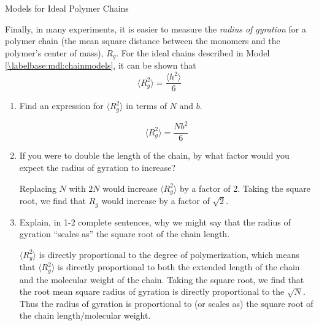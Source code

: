 \begin{activity}{Models for Ideal Polymer Chains}
\begin{ctqs}
		\begin{solution}[1.25in]\studentdisplay{}
		\end{solution}
	
	\question Finally, in many experiments, it is easier to measure the \emph{radius of gyration} for a polymer chain (the mean square distance between the monomers and the polymer's center of mass), $R_g$.  For the ideal chains described in Model \ref{\labelbase:mdl:chainmodels}, it can be shown that
		\begin{equation*}
			\langle R_g^2\rangle = \frac{\langle h^2\rangle}{6}
		\end{equation*}
		
		\begin{enumerate}
			\item Find an expression for $\langle R_g^2 \rangle$ in terms of $N$ and $b$.
	
		\begin{solution}[0.75in]
			\begin{equation*}
				\langle R_g^2 \rangle = \frac{Nb^2}{6}
			\end{equation*}
		\end{solution}
			
			\item If you were to double the length of the chain, by what factor would you expect the radius of gyration to increase?
	
		\begin{solution}[0.75in]
			Replacing $N$ with $2N$ would increase $\langle R_g^2 \rangle$ by a factor of 2. Taking the square root, we find that $R_g$ would increase by a factor of $\sqrt{2}$.
		\end{solution}
			
			\item Explain, in 1-2 complete sentences, why we might say that the radius of gyration ``scales as'' the square root of the chain length.
	
		\begin{solution}[1.5in]
			$\langle R_g^2 \rangle$ is directly proportional to the degree of polymerization, which means that $\langle R_g^2 \rangle$ is directly proportional to both the extended length of the chain and the molecular weight of the chain.  Taking the square root, we find that the root mean square radius of gyration is directly proportional to the $\sqrt{N}$.  Thus the radius of gyration is proportional to (or scales as) the square root of the chain length/molecular weight.
		\end{solution}
		\end{enumerate}
	

\end{ctqs}
\end{activity}
